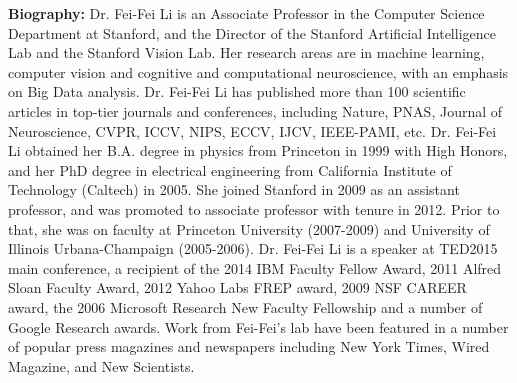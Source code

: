 \vfill
\noindent

{\bfseries Biography:} 
Dr. Fei-Fei Li is an Associate Professor in the Computer Science
Department at Stanford, and the Director of the Stanford Artificial
Intelligence Lab and the Stanford Vision Lab. Her research areas are
in machine learning, computer vision and cognitive and computational
neuroscience, with an emphasis on Big Data analysis. Dr. Fei-Fei Li
has published more than 100 scientific articles in top-tier journals
and conferences, including Nature, PNAS, Journal of Neuroscience,
CVPR, ICCV, NIPS, ECCV, IJCV, IEEE-PAMI, etc. Dr. Fei-Fei Li obtained
her B.A. degree in physics from Princeton in 1999 with High Honors,
and her PhD degree in electrical engineering from California Institute
of Technology (Caltech) in 2005. She joined Stanford in 2009 as an
assistant professor, and was promoted to associate professor with
tenure in 2012. Prior to that, she was on faculty at Princeton
University (2007-2009) and University of Illinois Urbana-Champaign
(2005-2006). Dr. Fei-Fei Li is a speaker at TED2015 main conference, a
recipient of the 2014 IBM Faculty Fellow Award, 2011 Alfred Sloan
Faculty Award, 2012 Yahoo Labs FREP award, 2009 NSF CAREER award, the
2006 Microsoft Research New Faculty Fellowship and a number of Google
Research awards. Work from Fei-Fei’s lab have been featured in a
number of popular press magazines and newspapers including New York
Times, Wired Magazine, and New Scientists.

\newpage
